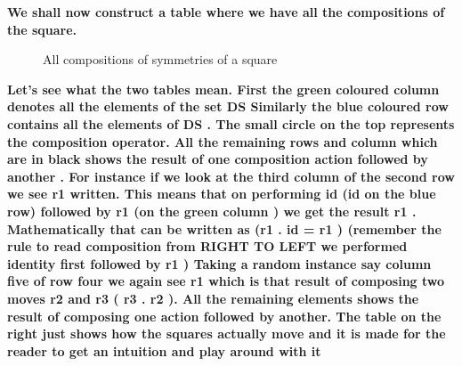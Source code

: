 \documentclass{article}
\begin{document}
\textbf{We shall now construct a table where we have all the  compositions of the square.   }
\pagebreak
\begin{figure}
    \centering
    \caption{All compositions of symmetries of a square }
\end{figure}
\textbf{Let's see what the two tables mean. First the green coloured  column denotes all the elements of the set DS Similarly the blue coloured row contains all the elements of DS . The small circle on the top represents the composition operator. All the remaining rows and column which are in black shows the result of one composition action followed by another .
    For instance if we look at the third column of the second row we see r1 written. This means that on performing id (id on the blue row) followed by r1 (on the green column ) we get the result r1 . Mathematically that can be written as (r1 . id = r1 ) (remember the rule to read composition from RIGHT TO LEFT we performed identity first followed by r1 )
Taking a random instance say column five of row four we again see r1 which is that result of composing two moves r2 and r3 ( r3 . r2 ). All the remaining elements shows the result of composing one action followed by another. The table on the right just shows how the squares actually move and it is made for the reader to get an intuition and play around with it }
\end{document}
